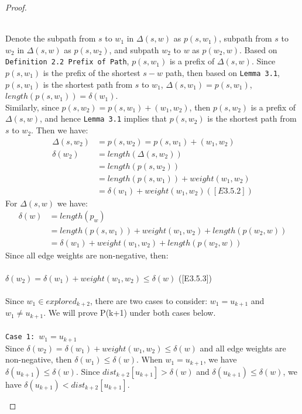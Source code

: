 \documentclass[11pt, oneside]{article}   	%
\newcommand\tab[1][1cm]{\hspace*{#1}}
\theoremstyle{definition}
\begin{document}
\begin{proof}
\begin{itemize}
\begin{enumerate}
\begin{center}
  \end{center}
  \tab\\
  Denote the subpath from $s$ to $w_1$ in $\Delta(s, w)$ as $p(s, w_1)$, subpath from $s$ to $w_2$ in $\Delta(s, w)$ as $p(s, w_2)$, and subpath $w_2$ to $w$ as $p(w_2, w)$. Based on \texttt{Definition 2.2 Prefix of Path}, $p(s, w_1)$ is a prefix of $\Delta(s, w)$. Since $p(s, w_1)$ is the prefix of the shortest $s-w$ path, then based on \texttt{Lemma 3.1}, $p(s, w_1)$ is the shortest path from $s$ to $w_1$, $\Delta(s, w_1) = p(s, w_1)$, $length(p(s, w_1)) = \delta(w_1)$. 
  \\
  Similarly, since $p(s, w_2) = p(s, w_1) + (w_1, w_2)$, then $p(s, w_2)$ is a prefix of $\Delta(s, w)$, and hence \texttt{Lemma 3.1} implies that $p(s, w_2)$ is the shortest path from $s$ to $w_2$. Then we have: 
  \begin{align*} 
      \Delta(s, w_2) &= p(s, w_2) = p(s, w_1) + (w_1, w_2) \\
      \delta(w_2) &= length(\Delta(s, w_2)) \\
                  &= length(p(s, w_2)) \\
                  &= length(p(s, w_1)) + weight(w_1, w_2)\\
                  &= \delta(w_1) + weight(w_1, w_2) ([E3.5.2])
  \end{align*}
  For $\Delta(s, w)$ we have: 
  \begin{align*}
    \delta(w) &= length(p_w) \\
              &= length(p(s, w_1)) + weight(w_1, w_2) + length(p(w_2, w)) \\
              &= \delta(w_1) + weight(w_1, w_2) + length(p(w_2, w))
  \end{align*}
  Since all edge weights are non-negative, then: 
  \\\\
    \tab $\delta(w_2) = \delta(w_1) + weight(w_1, w_2) \leq \delta(w)$ ([E3.5.3])
  \\\\
  Since $w_1 \in explored_{k+2}$, there are two cases to consider: $w_1 =u_{k+1}$ and $w_1 \neq u_{k+1}$. We will prove P(k+1) under both cases below. 
  \\\\
  \texttt{Case 1: $w_1 = u_{k+1}$}
  \\
  Since $\delta(w_2) = \delta(w_1) + weight(w_1, w_2) \leq \delta(w)$ and all edge weights are non-negative, then $\delta(w_1) \leq \delta(w)$. When $w_1 = u_{k+1}$, we have $\delta(u_{k+1}) \leq \delta(w)$. Since $dist_{k+2}[u_{k+1}] > \delta(w)$ and $\delta(u_{k+1}) \leq \delta(w)$, we have $\delta(u_{k+1}) < dist_{k+2}[u_{k+1}]$.

\end{enumerate}
\end{itemize}
\end{proof}
\end{document}
